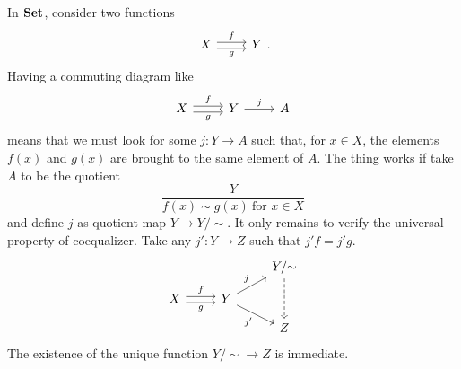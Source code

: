 \begin{example}
  In \(\mathbf{Set}\), consider two functions
  \[
    \begin{tikzcd}
      X \ar["f", r, shift left] \ar["g", r, shift right, swap] & Y
    \end{tikzcd} .
  \] Having a commuting diagram like
  \[
    \begin{tikzcd}
      X \ar["f", r, shift left] \ar["g", r, shift right, swap] & Y
      \ar["j", r] & A
    \end{tikzcd}
  \]
  means that we must look for some \(j : Y \to A\) such that, for
  \(x \in X\), the elements \(f(x)\) and \(g(x)\) are brought to the same
  element of \(A\). The thing works if take \(A\) to be the quotient
  \[
    \frac{Y}{f(x) \sim g(x) \ \text{for } x \in X}
  \]
  and define \(j\) as quotient map \(Y \to Y{/}{\sim}\). It only remains to
  verify the universal property of coequalizer. Take any
  \(j' : Y \to Z\) such that \(j'f = j'g\).
  \[
    \begin{tikzcd}[row sep=small]
      & & Y{/}{\sim} \ar[dd, dashed] \\
      X \ar["f", r, shift left] \ar["g", r, shift right, swap] & Y \ar["j", ur] \ar["{j'}", dr, swap] \\
      & & Z
    \end{tikzcd}
  \]
  The existence of the unique function \(Y{/}{\sim} \to Z\) is immediate.
\end{example}

